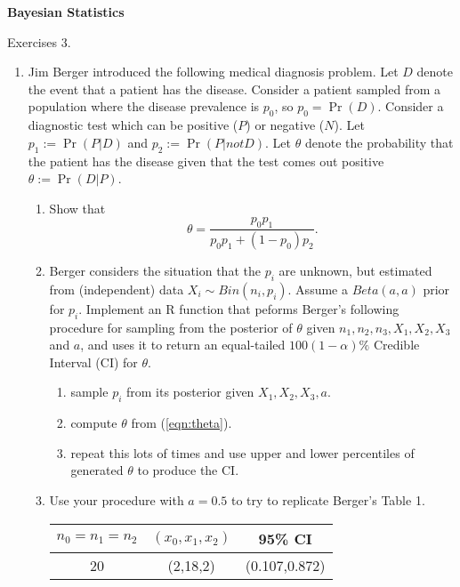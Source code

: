 \documentclass[12pt]{article}
\begin{document}
\begin{center}
{\bf
Bayesian Statistics

\smallskip

Exercises 3.
}
\smallskip

\end{center}

\bigskip

\begin{enumerate}
\item Jim Berger introduced the following medical diagnosis problem. Let $D$ denote the event that a patient has the disease. Consider a patient sampled from a population where the disease prevalence is $p_0$, so $p_0 = \Pr(D)$. Consider a diagnostic test which can be positive ($P$) or negative ($N$).
Let $p_1:= \Pr(P| D)$ and $p_2:=\Pr(P | not D)$. Let $\theta$ denote the probability that the patient has the disease given that the test comes out positive $\theta:=\Pr(D|P)$.
\begin{enumerate}
\item Show that 
\begin{equation} \label{eqn:theta}
\theta = \frac{p_0p_1}{p_0p_1 + (1-p_0)p_2}.
\end{equation}
\item Berger considers the situation that the $p_i$ are unknown, but estimated from (independent) 
data $X_i \sim Bin(n_i,p_i)$. Assume a $Beta(a,a)$ prior for $p_i$. Implement an R function that peforms Berger's following procedure for sampling from the posterior of $\theta$ given $n_1,n_2,n_3,X_1,X_2,X_3$ and $a$, and uses it to return an equal-tailed $100(1-\alpha) \%$ Credible Interval (CI) for $\theta$.
\begin{enumerate}
\item sample $p_i$ from its posterior given $X_1,X_2,X_3,a$.
\item compute $\theta$ from (\ref{eqn:theta}).
\item repeat this lots of times and use upper and lower percentiles of generated $\theta$ to produce the CI.
\end{enumerate}
\item Use your procedure with $a=0.5$ to try to replicate Berger's Table 1. 
\begin{table}[h!]
\begin{center}
\begin{tabular}{c|c|c}
$n_0=n_1=n_2$ & $(x_0,x_1,x_2)$ & 95\% CI \\ \hline
20 & (2,18,2) & (0.107,0.872)  \\

\end{tabular}
\end{center}
\end{table}
\end{enumerate}
\end{enumerate}
\end{document}
